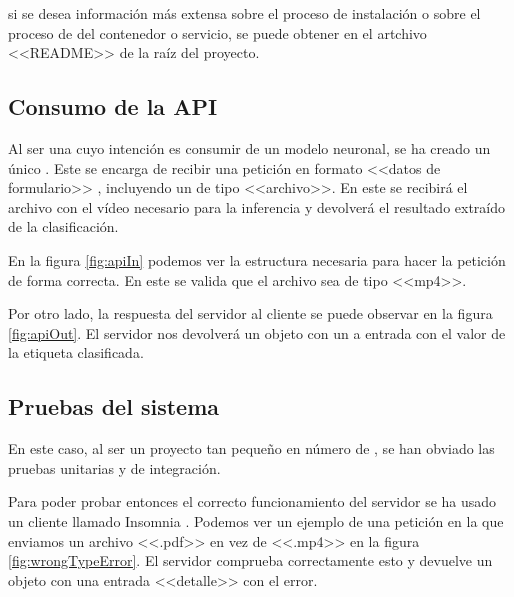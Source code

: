 si se desea información más extensa sobre el proceso de instalación o sobre el proceso de  del contenedor o servicio, se puede obtener en el artchivo <<README>> de la raíz del proyecto.

\subsection{Consumo de la API}

Al ser una  cuyo intención es consumir de un modelo neuronal, se ha creado un único . Este  se encarga de recibir una petición en formato <<datos de formulario>> , incluyendo un  de tipo <<archivo>>. En este  se recibirá el archivo con el vídeo necesario para la inferencia y devolverá el resultado extraído de la clasificación.

En la figura \ref{fig:apiIn} podemos ver la estructura necesaria para hacer la petición de forma correcta. En este  se valida que el archivo sea de tipo <<mp4>>.


Por otro lado, la respuesta del servidor al cliente se puede observar en la figura \ref{fig:apiOut}. El servidor nos devolverá un objeto  con un a entrada con el valor de la etiqueta clasificada.




\subsection{Pruebas del sistema}

En este caso, al ser un proyecto tan pequeño en número de , se han obviado las pruebas unitarias y de integración.

Para poder probar entonces el correcto funcionamiento del servidor se ha usado un cliente  llamado Insomnia . Podemos ver un ejemplo de una petición en la que enviamos un archivo <<.pdf>> en vez de <<.mp4>> en la figura \ref{fig:wrongTypeError}. El servidor comprueba correctamente esto y devuelve un objeto  con una entrada <<detalle>> con el error.

